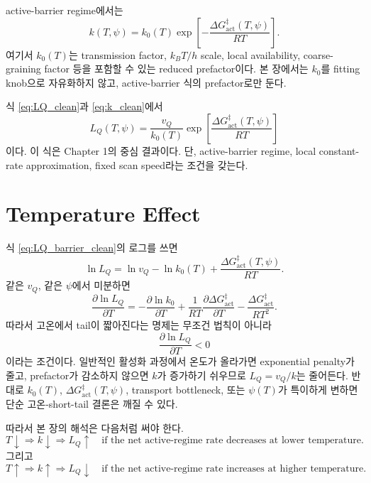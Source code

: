 \documentclass[11pt,a4paper]{article}
\begin{document}
active-barrier regime에서는
\begin{equation}
\boxed{
k(T,\psi)
=
k_0(T)
\exp\!\left[
-\frac{\Delta G_{\mathrm{act}}^\ddagger(T,\psi)}{RT}
\right].
}
\label{eq:k_clean}
\end{equation}
여기서 \(k_0(T)\)는 transmission factor, \(k_B T/h\) scale, local availability, coarse-graining factor 등을 포함할 수 있는 reduced prefactor이다. 본 장에서는 \(k_0\)를 fitting knob으로 자유화하지 않고, active-barrier 식의 prefactor로만 둔다.

식 \eqref{eq:LQ_clean}과 \eqref{eq:k_clean}에서
\begin{equation}
\boxed{
L_Q(T,\psi)
=
\frac{v_Q}{k_0(T)}
\exp\!\left[
\frac{\Delta G_{\mathrm{act}}^\ddagger(T,\psi)}{RT}
\right]
}
\label{eq:LQ_barrier_clean}
\end{equation}
이다. 이 식은 Chapter 1의 중심 결과이다. 단, active-barrier regime, local constant-rate approximation, fixed scan speed라는 조건을 갖는다.

\section{Temperature Effect}

식 \eqref{eq:LQ_barrier_clean}의 로그를 쓰면
\begin{equation}
\ln L_Q
=
\ln v_Q
-
\ln k_0(T)
+
\frac{\Delta G_{\mathrm{act}}^\ddagger(T,\psi)}{RT}.
\label{eq:lnL_clean}
\end{equation}
같은 \(v_Q\), 같은 \(\psi\)에서 미분하면
\begin{equation}
\frac{\partial\ln L_Q}{\partial T}
=
-
\frac{\partial\ln k_0}{\partial T}
+
\frac{1}{RT}
\frac{\partial\Delta G_{\mathrm{act}}^\ddagger}{\partial T}
-
\frac{\Delta G_{\mathrm{act}}^\ddagger}{RT^2}.
\label{eq:T_deriv_clean}
\end{equation}
따라서 고온에서 tail이 짧아진다는 명제는 무조건 법칙이 아니라
\begin{equation}
\frac{\partial\ln L_Q}{\partial T}<0
\end{equation}
이라는 조건이다. 일반적인 활성화 과정에서 온도가 올라가면 exponential penalty가 줄고, prefactor가 감소하지 않으면 \(k\)가 증가하기 쉬우므로 \(L_Q=v_Q/k\)는 줄어든다. 반대로 \(k_0(T)\), \(\Delta G_{\mathrm{act}}^\ddagger(T,\psi)\), transport bottleneck, 또는 \(\psi(T)\)가 특이하게 변하면 단순 고온-short-tail 결론은 깨질 수 있다.

따라서 본 장의 해석은 다음처럼 써야 한다.
\begin{equation}
T\downarrow
\Rightarrow
k\downarrow
\Rightarrow
L_Q\uparrow
\quad
\text{if the net active-regime rate decreases at lower temperature.}
\end{equation}
그리고
\begin{equation}
T\uparrow
\Rightarrow
k\uparrow
\Rightarrow
L_Q\downarrow
\quad
\text{if the net active-regime rate increases at higher temperature.}
\end{equation}
\end{document}
